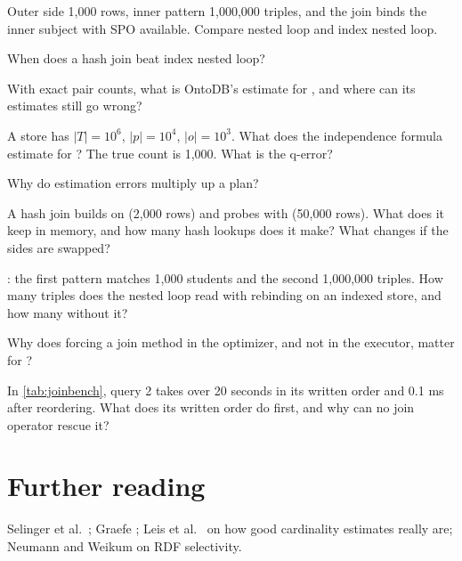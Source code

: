 \begin{checkyourself}
\item Outer side 1,000 rows, inner pattern 1,000,000 triples, and the join binds the inner subject with SPO available. Compare nested loop and index nested loop.
\item When does a hash join beat index nested loop?
\item With exact pair counts, what is OntoDB's estimate for , and where can its estimates still go wrong?
\item A store has $|T| = 10^6$, $|p| = 10^4$, $|o| = 10^3$. What does the independence formula estimate for ? The true count is 1,000. What is the q-error?
\item Why do estimation errors multiply up a plan?
\item A hash join builds on  (2,000 rows) and probes with  (50,000 rows). What does it keep in memory, and how many hash lookups does it make? What changes if the sides are swapped?
\item {}: the first pattern matches 1,000 students and the second 1,000,000 triples. How many triples does the nested loop read with rebinding on an indexed store, and how many without it?
\item Why does forcing a join method in the optimizer, and not in the executor, matter for ?
\item In \cref{tab:joinbench}, query 2 takes over 20 seconds in its written order and 0.1 ms after reordering. What does its written order do first, and why can no join operator rescue it?
\end{checkyourself}

\section*{Further reading}
Selinger et al.\ \cite{selinger}; Graefe \cite{graefe}; Leis et al.\
\cite{leis2015} on how good cardinality estimates really are; Neumann and
Weikum \cite{rdf3x} on RDF selectivity.
